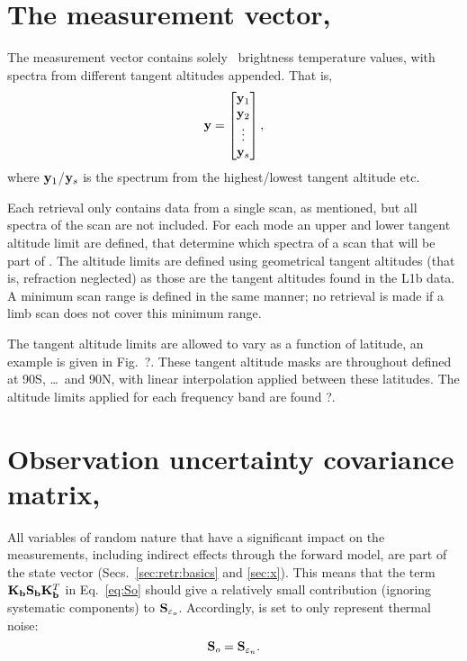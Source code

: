 \section{The measurement vector, \MsrVct}
\label{sec:y}
%
The measurement vector contains solely \smr\ brightness temperature values,
with spectra from different tangent altitudes appended. That is,
\begin{equation}
  \label{eq:y}
  \mathbf{y} =
  \begin{bmatrix}
    \mathbf{y}_1\\ 
    \mathbf{y}_2\\ 
    \vdots\\ 
    \mathbf{y}_s
  \end{bmatrix},
\end{equation}
where $\mathbf{y}_1$/$\mathbf{y}_s$ is the spectrum from the highest/lowest tangent
altitude etc. 

Each retrieval only contains data from a single scan, as mentioned, but all
spectra of the scan are not included. For each mode an upper and lower tangent
altitude limit are defined, that determine which spectra of a scan that will be
part of \MsrVct. The altitude limits are defined using geometrical tangent
altitudes (that is, refraction neglected) as those are the tangent altitudes
found in the L1b data. A minimum scan range is defined in the same manner; no
retrieval is made if a limb scan does not cover this minimum range.

The tangent altitude limits are allowed to vary as a function of latitude, an
example is given in Fig.~?. These tangent altitude masks are
throughout defined at 90\degree S, \dots{}\ and 90\degree N,
with linear interpolation applied between these latitudes. The altitude limits
applied for each frequency band are found ?.



\section{Observation uncertainty covariance matrix, }
\label{sec:So}
%
All variables of random nature that have a significant impact on the
measurements, including indirect effects through the forward model, are part of
the state vector (Secs.~\ref{sec:retr:basics} and \ref{sec:x}). This means that
the term $\mathbf{K}_{\mathbf{b}}\mathbf{S}_{\mathbf{b}} \mathbf{K}_{\mathbf{b}}^T$ in
Eq.~\ref{eq:So} should give a relatively small contribution (ignoring
systematic components) to $\mathbf{S}_{\varepsilon_o}$. Accordingly,  is
set to only represent thermal noise:
\begin{equation}
  \mathbf{S}_{o} = \mathbf{S}_{\varepsilon_n}.
\end{equation}
\\


